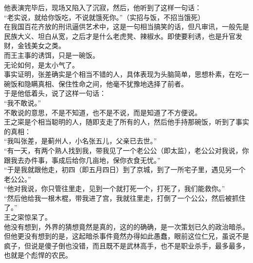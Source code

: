 \begin{multicols}{\theparacolNo}
他表演完毕后，现场又陷入了沉寂，然后，他听到了这样一句话：\\

“老实说，就给你饭吃，不说就饿死你。”（实招与饭，不招当饿死）\\

在我国百花齐放的刑讯逼供艺术中，这是一句相当搞笑的话，但凡审讯，一般先是民族大义、坦白从宽，之后才是什么老虎凳、辣椒水。即使要利诱，也是升官发财，金钱美女之类。\\

而王主事的诱饵，只是一碗饭。\\

无论如何，是太小气了。\\

事实证明，张差确实是个相当不错的人，具体表现为头脑简单，思想朴素，在吃一碗饭和隐瞒真相、保住性命之间，他毫不犹豫地选择了前者。\\

于是他低着头，说了这样一句话：\\

“我不敢说。”\\

不敢说的意思，不是不知道，也不是不说，而是知道了不方便说。\\

王之寀是个相当聪明的人，随即支走了所有的人，然后他手持那碗饭，听到了事实的真相：\\

“我叫张差，是蓟州人，小名张五儿，父亲已去世。”\\

“有一天，有两个熟人找到我，带我见了一个老公公（即太监），老公公对我说，你跟我去办件事，事成后给你几亩地，保你衣食无忧。”\\

“于是我就跟他走，初四（即五月四日）到了京城，到了一所宅子里，遇见另一个老公公。”\\

“他对我说，你只管往里走，见到一个就打死一个，打死了，我们能救你。”\\

“然后他给我一根木棍，带我进了宫，我就往里走，打倒了一个公公，然后被抓住了。”\\

王之寀惊呆了。\\

他没有想到，外界的猜想竟然是真的，这的的确确，是一次策划已久的政治暗杀。\\

但他更没有想到的是，这起暗杀事件竟然办得如此愚蠢，眼前这位仁兄，虽说不是疯子，但说是傻子倒也没错，而且既不是武林高手，也不是职业杀手，最多最多，也就是个彪悍的农民。\\


\end{multicols}
